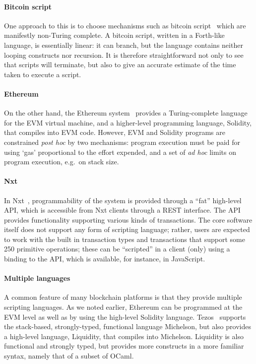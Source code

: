 \documentclass[runningheads]{llncs}
\begin{document}
\paragraph{Bitcoin script}

One approach to this is to choose mechanisms such as bitcoin script~\cite{BitcoinWikiScript} which are manifestly 
non-Turing complete. A bitcoin script, written in a Forth-like language, is essentially linear: it can branch, but the 
language contains neither looping constructs nor recursion. It is therefore straightforward not only to see that scripts 
will terminate, but also to give an accurate estimate of the time taken to execute a script. 

\paragraph{Ethereum}

On the other hand, the Ethereum system~\cite{wood2014ethereum} provides a Turing-complete language for the EVM virtual 
machine, and a higher-level programming language, Solidity, that compiles into EVM code. However, EVM and Solidity 
programs are constrained \emph{post hoc} by two mechanisms: program execution must be paid for using `gas' proportional 
to the effort expended, and a set of \emph{ad hoc} limits on program execution, e.g.\ on stack size.

\paragraph{Nxt}

In Nxt~\cite{Nxt}, programmability of the system is provided through a ``fat'' high-level 
API, which is accessible from Nxt clients through a REST interface. The API provides functionality supporting various 
kinds of transactions. The core software itself does not support any form of scripting language; rather, users are 
expected to work with the built in transaction types and transactions that support some 250 primitive operations; these 
can be ``scripted'' in a client (only) using a binding to the API, which is available, for instance, in JavaScript.

\paragraph{Multiple languages}

A common feature of many blockchain platforms is that they provide multiple scripting languages. As we noted earlier, 
Ethereum can be programmed at the EVM level as well as by using the high-level Solidity language. 
Tezos~\cite{tezos-white-paper} supports the stack-based, strongly-typed, functional language Michelson, but also 
provides a high-level language, Liquidity, that compiles into Michelson. Liquidity is also functional and strongly 
typed, but provides more constructs in a more familiar syntax, namely that of a subset of OCaml. 
\end{document}
